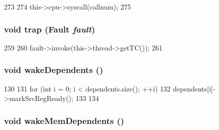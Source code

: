 \begin{DoxyCode}
273 {
274     this->cpu->syscall(callnum);
275 }
\end{DoxyCode}
\hypertarget{classOzoneDynInst_ac74f75adb89c94e4387498067f5567ff}{
\subsubsection[{trap}]{\setlength{\rightskip}{0pt plus 5cm}void trap ({\bf Fault} {\em fault})}}
\label{classOzoneDynInst_ac74f75adb89c94e4387498067f5567ff}



\begin{DoxyCode}
259 {
260     fault->invoke(this->thread->getTC());
261 }
\end{DoxyCode}
\hypertarget{classOzoneDynInst_a5e49f18c82c005142bde7623230b7257}{
\subsubsection[{wakeDependents}]{\setlength{\rightskip}{0pt plus 5cm}void wakeDependents ()}}
\label{classOzoneDynInst_a5e49f18c82c005142bde7623230b7257}



\begin{DoxyCode}
130 {
131     for (int i = 0; i < dependents.size(); ++i) {
132         dependents[i]->markSrcRegReady();
133     }
134 }
\end{DoxyCode}
\hypertarget{classOzoneDynInst_a841278536a46f85a1dd346c1d4f961e1}{
\subsubsection[{wakeMemDependents}]{\setlength{\rightskip}{0pt plus 5cm}void wakeMemDependents ()}}
\label{classOzoneDynInst_a841278536a46f85a1dd346c1d4f961e1}



